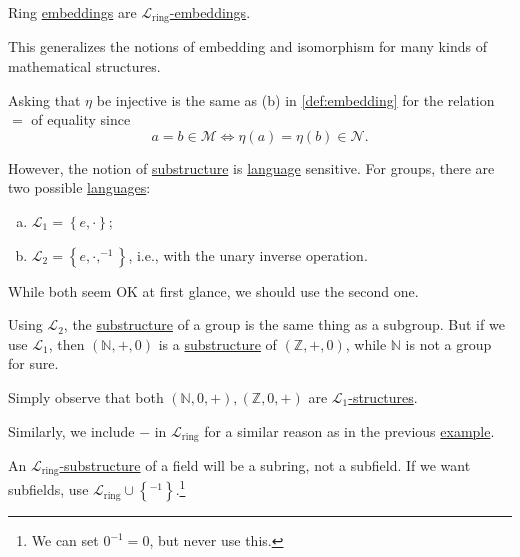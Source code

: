 \begin{eg}
	Ring \hyperref[def:embedding]{embeddings} are \hyperref[def:embedding]{\(\mathcal{L} _{\text{ring} }\)-embeddings}.
\end{eg}

This generalizes the notions of embedding and isomorphism for many kinds of mathematical structures.

\begin{remark}
	Asking that \(\eta \) be injective is the same as (b) in \autoref{def:embedding} for the relation \(=\) of equality since
	\[
		a=b \in \mathcal{M} \iff \eta (a) = \eta (b) \in \mathcal{N} .
	\]
\end{remark}

However, the notion of \hyperref[def:substructure]{substructure} is \hyperref[def:language]{language} sensitive. For groups, there are two possible \hyperref[def:language]{languages}:
\begin{enumerate}[(a)]
	\item \(\mathcal{L} _1 = \left\{ e, \cdot \right\} \);
	\item \(\mathcal{L} _2 = \left\{ e, \cdot, ^{-1} \right\} \), i.e., with the unary inverse operation.
\end{enumerate}
While both seem OK at first glance, we should use the second one.

\begin{remark}
	Using \(\mathcal{L} _2\), the \hyperref[def:substructure]{substructure} of a group is the same thing as a subgroup. But if we use \(\mathcal{L} _1\), then \((\mathbb{N}, +, 0)\) is a \hyperref[def:substructure]{substructure} of \((\mathbb{Z} , +, 0)\), while \(\mathbb{N} \) is not a group for sure.
\end{remark}
\begin{explanation}
	Simply observe that both \((\mathbb{N} , 0, +), (\mathbb{Z} , 0, +)\) are \hyperref[def:structure]{\(\mathcal{L} _1\)-structures}.
\end{explanation}

Similarly, we include \(-\) in \(\mathcal{L} _{\text{ring}}\) for a similar reason as in the previous \hyperref[eg:language-ring]{example}.

\begin{eg}
	An \hyperref[def:substructure]{\(\mathcal{L} _{\text{ring} }\)-substructure} of a field will be a subring, not a subfield. If we want subfields, use \(\mathcal{L} _{\text{ring} } \cup \left\{ ^{-1} \right\} \).\footnote{We can set \(0^{-1} = 0\), but never use this.}
\end{eg}